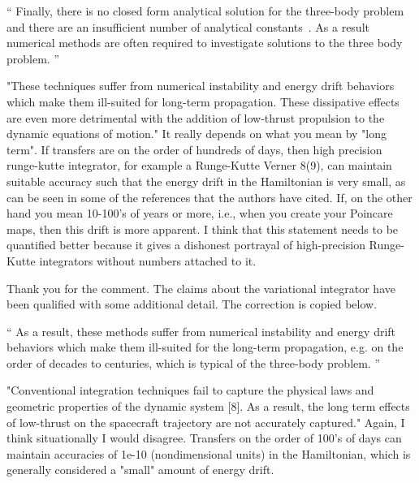 \documentclass[11pt]{article}
\newenvironment{correction}{\begin{list}{}{\setlength{\leftmargin}{1cm}\setlength{\rightmargin}{1cm}}\vspace{\parsep}\item[]``}{''\end{list}}
\begin{document}
\begin{enumerate}
\begin{correction}
Finally, there is no closed form analytical solution for the three-body problem and there are an insufficient number of analytical constants~\cite{szebehely1967}.
As a result numerical methods are often required to investigate solutions to the three body problem.
\end{correction}

\item 
    \begin{itshape}
"These techniques suffer from numerical instability and energy drift behaviors which make them ill-suited for long-term propagation. These dissipative effects are even more detrimental with the addition of low-thrust propulsion to the dynamic equations of motion."  It really depends on what you mean by "long term".  If transfers are on the order of hundreds of days, then high precision runge-kutte integrator, for example a Runge-Kutte Verner 8(9), can maintain suitable accuracy such that the energy drift in the Hamiltonian is very small, as can be seen in some of the references that the authors have cited.  If, on the other hand you mean 10-100's of years or more, i.e., when you create your Poincare maps, then this drift is more apparent.  I think that this statement needs to be quantified better because it gives a dishonest portrayal of high-precision Runge-Kutte integrators without numbers attached to it.
\end{itshape}

Thank you for the comment. 
The claims about the variational integrator have been qualified with some additional detail.
The correction is copied below.
\begin{correction}
As a result, these methods suffer from numerical instability and energy drift behaviors which make them ill-suited for the long-term propagation, e.g. on the order of decades to centuries, which is typical of the three-body problem. 
\end{correction}

\item
    \begin{itshape}
"Conventional integration techniques fail to capture the physical laws and geometric properties of the dynamic system [8]. As a result, the long term effects of low-thrust on the spacecraft trajectory are not accurately captured."  Again, I think situationally I would disagree.  Transfers on the order of 100's of days can maintain accuracies of 1e-10 (nondimensional units) in the Hamiltonian, which is generally considered a "small" amount of energy drift.
\end{itshape}


\end{enumerate}
\end{document}
